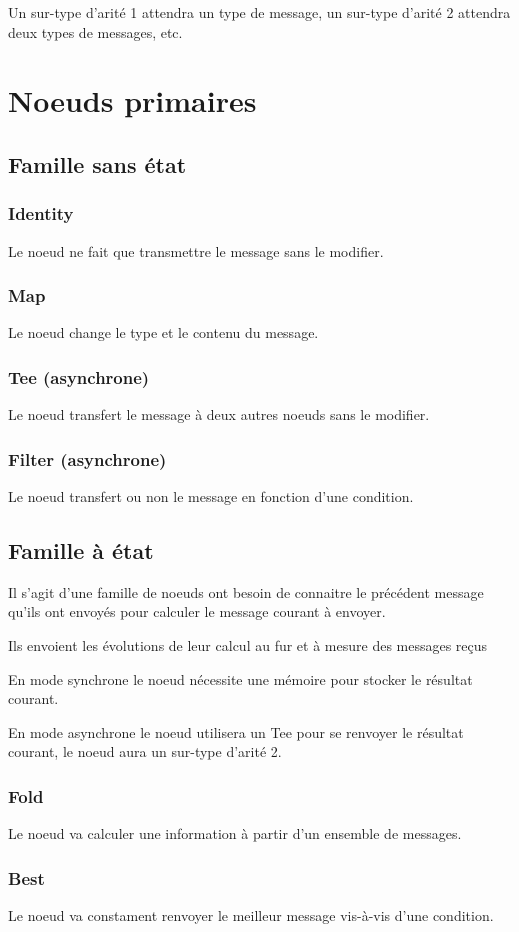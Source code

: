 \documentclass{article}
\begin{document}
Un sur-type d'arité 1 attendra un type de message, un sur-type d'arité 2 attendra
deux types de messages, etc.

\section{Noeuds primaires}
\subsection{Famille sans état}
\subsubsection{Identity}
Le noeud ne fait que transmettre le message sans le modifier.

\subsubsection{Map}
Le noeud change le type et le contenu du message.

\subsubsection{Tee (asynchrone)}
Le noeud transfert le message à deux autres noeuds sans le modifier.

\subsubsection{Filter (asynchrone)}
Le noeud transfert ou non le message en fonction d'une condition.

\subsection{Famille à état}
Il s'agit d'une famille de noeuds ont besoin de connaitre le précédent message qu'ils
ont envoyés pour calculer le message courant à envoyer.

Ils envoient les évolutions de leur calcul au fur et à mesure des messages reçus

En mode synchrone le noeud nécessite une mémoire pour stocker le résultat courant.

En mode asynchrone le noeud utilisera un Tee pour se renvoyer le résultat courant,
le noeud aura un sur-type d'arité 2.

\subsubsection{Fold}
Le noeud va calculer une information à partir d'un ensemble de messages.

\subsubsection{Best}
Le noeud va constament renvoyer le meilleur message vis-à-vis d'une condition.
\end{document}
